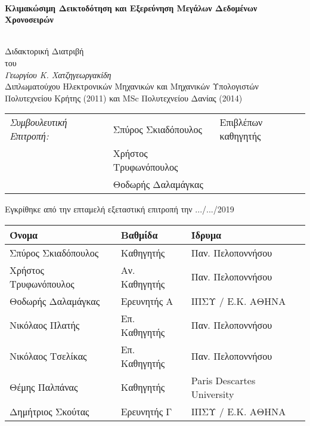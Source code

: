\begin{center}
%
%
%


\vspace{-3ex}
\HRule \\[0.4cm]
{ \huge \bfseries Κλιμακώσιμη Δεικτοδότηση και Εξερεύνηση Μεγάλων Δεδομένων Χρονοσειρών \\[0.4cm] }
\HRule \\[1.5cm]
\vspace{-5ex}
\small
\begin{center}
Διδακτορική Διατριβή\\
του\\
{\large \emph{Γεωργίου Κ. Χατζηγεωργακίδη}}\\
\vspace{1.4ex}
Διπλωματούχου Ηλεκτρονικών Μηχανικών και Μηχανικών Υπολογιστών Πολυτεχνείου Κρήτης (2011) και MSc Πολυτεχνείου Δανίας (2014) \\

\end{center}
\vfill
\begin{center}
\begin{tabular}{lll}
\emph{Συμβουλευτική Επιτροπή:} & Σπύρος Σκιαδόπουλος & Επιβλέπων καθηγητής\\
& Χρήστος Τρυφωνόπουλος\\
& Θοδωρής Δαλαμάγκας\\
\end{tabular}
\end{center}

\vspace{2ex}
Εγκρίθηκε από την επταμελή εξεταστική επιτροπή την .../.../2019\\
\vfill


\begin{tabular}{l@{\hskip 1in}l@{\hskip 1in}l}
Όνομα & Βαθμίδα & Ίδρυμα \\ \hline \hline
Σπύρος Σκιαδόπουλος & Καθηγητής & Παν. Πελοποννήσου\\
Χρήστος Τρυφωνόπουλος & Αν. Καθηγητής & Παν. Πελοποννήσου\\
Θοδωρής Δαλαμάγκας & Ερευνητής Α & ΙΠΣΥ / Ε.Κ. ΑΘΗΝΑ\\
Νικόλαος Πλατής & Επ. Καθηγητής & Παν. Πελοποννήσου\\
Νικόλαος Τσελίκας & Επ. Καθηγητής & Παν. Πελοποννήσου\\
Θέμης Παλπάνας & Καθηγητής & Paris Descartes University\\
Δημήτριος Σκούτας & Ερευνητής Γ & ΙΠΣΥ / Ε.Κ. ΑΘΗΝΑ\\
\end{tabular}



\end{center}

